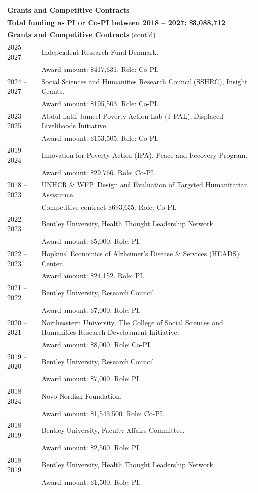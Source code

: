 \documentclass[12pt]{article}
\begin{document}
\setlength\LTpre{0pt}
\setlength\LTpost{0pt}
\begin{longtable}{p{3cm}p{\dimexpr\textwidth-3cm\relax}}
\multicolumn{2}{l}{\textbf{Grants and Competitive Contracts}} \\[5pt]
\multicolumn{2}{l}{\textbf{Total funding as PI or Co-PI between 2018 -- 2027: \$3,088,712}} \\[10pt]
\endfirsthead
\multicolumn{2}{l}{\textbf{Grants and Competitive Contracts} (cont'd)} \\[5pt]
\endhead
2025 -- 2027 & Independent Research Fund Denmark.  \\
& Award amount: \$417,631. Role: Co-PI. \\[3pt]
2024 -- 2027 & Social Sciences and Humanities Research Council (SSHRC), Insight Grants. \\
& Award amount: \$195,503. Role: Co-PI. \\[3pt]
2023 -- 2025 & Abdul Latif Jameel Poverty Action Lab (J-PAL), Displaced Livelihoods Initiative. \\
& Award amount: \$153,505. Role: Co-PI. \\[3pt]
2019 -- 2024 & Innovation for Poverty Action (IPA), Peace and Recovery Program. \\
& Award amount: \$29,766. Role: Co-PI. \\[3pt]
2018 -- 2023 & UNHCR \& WFP. Design and Evaluation of Targeted Humanitarian Assistance. \\
& Competitive contract \$693,655. Role: Co-PI. \\[3pt]
2022 -- 2023 & Bentley University, Health Thought Leadership Network. \\
& Award amount: \$5,000. Role: PI. \\[3pt]
2022 -- 2023 & Hopkins' Economics of Alzheimer's Disease \& Services (HEADS) Center. \\
& Award amount: \$24,152. Role: PI. \\[3pt]
2021 -- 2022 & Bentley University, Research Council. \\
& Award amount: \$7,000. Role: PI. \\[3pt]
2020 -- 2021 & Northeastern University, The College of Social Sciences and Humanities Research Development Initiative. \\
& Award amount: \$8,000. Role: Co-PI.  \\[3pt]
2019 -- 2020 & Bentley University, Research Council. \\
& Award amount: \$7,000. Role: PI. \\[3pt]
2018 -- 2024 & Novo Nordisk Foundation. \\
& Award amount: \$1,543,500. Role: Co-PI.  \\[3pt]
2018 -- 2019 & Bentley University, Faculty Affairs Committee. \\
& Award amount: \$2,500. Role: PI. \\[3pt]
2018 -- 2019 & Bentley University, Health Thought Leadership Network. \\
& Award amount: \$1,500. Role: PI. \\[3pt]
\end{longtable}
\end{document}
